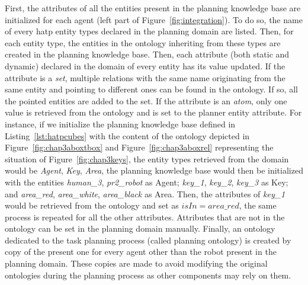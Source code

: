 \documentclass[a4paper,11pt,twoside]{StyleThese}
\begin{document}
First, the attributes of all the entities present in the planning knowledge base are initialized for each agent (left part of Figure~\ref{fig:integration}). To do so, the name of every \acrshort{hatp} entity types declared in the planning domain are listed. Then, for each entity type, the entities in the ontology inheriting from these types are created in the planning knowledge base. Then, each attribute (both static and dynamic) declared in the domain of every entity has its value updated. If the attribute is a \textit{set}, multiple relations with the same name originating from the same entity and pointing to different ones can be found in the ontology. If so, all the pointed entities are added to the set. If the attribute is an \textit{atom}, only one value is retrieved from the ontology and is set to the planner entity attribute. For instance, if we initialize the planning knowledge base defined in Listing~\ref{lst:hatpcubes} with the content of the ontology depicted in Figure~\ref{fig:chap3aboxtbox} and Figure~\ref{fig:chap3aboxrel} representing the situation of Figure~\ref{fig:chap3keys}, the entity types retrieved from the domain would be \textit{Agent}, \textit{Key}, \textit{Area}, the planning knowledge base would then be initialized with the entities \textit{human\_3}, \textit{pr2\_robot} as Agent; \textit{key\_1}, \textit{key\_2}, \textit{key\_3} as Key; and \textit{area\_red}, \textit{area\_white}, \textit{area\_black} as Area. Then, the attributes of \textit{key\_1} would be retrieved from the ontology and set as $isIn = area\_red$, the same process is repeated for all the other attributes. Attributes that are not in the ontology can be set in the planning domain manually.
Finally, an ontology dedicated to the task planning process (called planning ontology) is created by copy of the present one for every agent other than the robot present in the planning domain. These copies are made to avoid modifying the original ontologies during the planning process as other components may rely on them.
\end{document}
